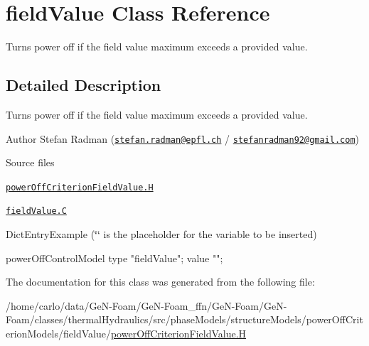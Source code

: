 \hypertarget{classFoam_1_1powerOffControlModels_1_1fieldValue}{}\section{field\+Value Class Reference}
\label{classFoam_1_1powerOffControlModels_1_1fieldValue}


Turns power off if the field value maximum exceeds a provided value.  




\subsection{Detailed Description}
Turns power off if the field value maximum exceeds a provided value. 

\label{_Description}%
 Author Stefan Radman (\href{mailto:stefan.radman@epfl.ch}{\tt stefan.\+radman@epfl.\+ch} / \href{mailto:stefanradman92@gmail.com}{\tt stefanradman92@gmail.\+com})

\begin{DoxyParagraph}{Source files}

\begin{DoxyItemize}
\item \href{../../../home/carlo/data/GeN-Foam/GeN-Foam_ffn/GeN-Foam/GeN-Foam/classes/thermalHydraulics/src/phaseModels/structureModels/powerOffCriterionModels/fieldValue/powerOffCriterionFieldValue.H}{\tt power\+Off\+Criterion\+Field\+Value.\+H} 
\item \href{../../../home/carlo/data/GeN-Foam/GeN-Foam_ffn/GeN-Foam/GeN-Foam/classes/thermalHydraulics/src/phaseModels/structureModels/powerOffCriterionModels/fieldValue/fieldValue.C}{\tt field\+Value.\+C} 
\end{DoxyItemize}Dict\+Entry\+Example (\char`\"{}\char`\"{} is the placeholder for the variable to be inserted) \begin{DoxyVerb}powerOffControlModel
{
    type        "fieldValue";
    value       "";   
}\end{DoxyVerb}
 
\end{DoxyParagraph}


The documentation for this class was generated from the following file\+:\begin{DoxyCompactItemize}
\item 
/home/carlo/data/\+Ge\+N-\/\+Foam/\+Ge\+N-\/\+Foam\+\_\+ffn/\+Ge\+N-\/\+Foam/\+Ge\+N-\/\+Foam/classes/thermal\+Hydraulics/src/phase\+Models/structure\+Models/power\+Off\+Criterion\+Models/field\+Value/\hyperlink{powerOffCriterionFieldValue_8H}{power\+Off\+Criterion\+Field\+Value.\+H}\end{DoxyCompactItemize}
